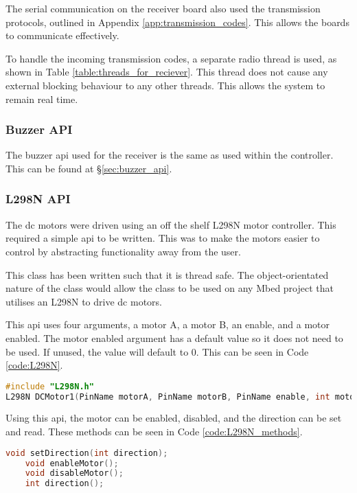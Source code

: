 \documentclass [11pt]{article}
\begin{document}
The serial communication on the receiver board also used the transmission protocols, outlined in Appendix \ref{app:transmission_codes}. This allows the boards to communicate effectively.

To handle the incoming transmission codes, a separate radio thread is used, as shown in Table \ref{table:threads_for_reciever}. This thread does not cause any external blocking behaviour to any other threads. This allows the system to remain real time. 

\subsubsection{Buzzer API}

The buzzer \gls{api} used for the receiver is the same as used within the controller. This can be found at §\ref{sec:buzzer_api}.

\subsubsection{L298N API}

The \gls{dc} motors were driven using an off the shelf L298N motor controller. This required a simple \gls{api} to be written. This was to make the motors easier to control by abstracting functionality away from the user. 

This class has been written such that it is thread safe. The object-orientated nature of the class would allow the class to be used on any Mbed project that utilises an L298N to drive \gls{dc} motors. 

This \gls{api} uses four arguments, a motor A, a motor B, an enable, and a motor enabled. The motor enabled argument has a default value so it does not need to be used. If unused, the value will default to 0. This can be seen in Code \ref{code:L298N}.

\begin{lstlisting}[language=C++,label=code:L298N,caption=L298N Class Constructor]
#include "L298N.h"
L298N DCMotor1(PinName motorA, PinName motorB, PinName enable, int motorEnabled = 0);
\end{lstlisting} 

Using this \gls{api}, the motor can be enabled, disabled, and the direction can be set and read. These methods can be seen in Code \ref{code:L298N_methods}.

\begin{lstlisting}[language=C++,label=code:L298N_methods,caption=L298N Class Methods]
    void setDirection(int direction);
    void enableMotor();
    void disableMotor();
    int direction();
\end{lstlisting}
\end{document}
